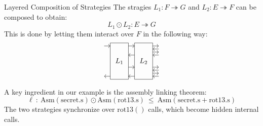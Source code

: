 \documentclass[aspectratio=1610,mathserif]{beamer}
\newcommand{\kw}[1]{\ensuremath{ \mathrm{#1} }}
\begin{document}
\begin{frame}{Layered Composition of Strategies}
  The stragies $L_1 : F \twoheadrightarrow G$ and
  $L_2 : E \twoheadrightarrow F$ can be composed to obtain:
  \[
     L_1 \odot L_2 : E \twoheadrightarrow G
  \]
  \pause
  This is done by letting them interact over $F$
  in the following way:
  \[
    \begin{tikzpicture}[yscale=0.15,xscale=0.30]
      \draw (1,-1) rectangle (4,11) node[midway] {$L_1$};
      \draw (5,-1) rectangle (8,11) node[midway] {$L_2$};
      \draw[->] (0,10) -- (1,10);
        \draw[->] (4,10) -- (5,10);
          \draw[->] (8,10) -- (9,10);
          \draw[->] (9,9) -- (8,9);
          \draw[->] (8,8) -- (9,8);
          \draw[->] (9,7) -- (8,7);
        \draw[->] (5,7) -- (4,7);
        \draw[->] (4,3) -- (5,3);
          \draw[->] (8,3) -- (9,3);
          \draw[->] (9,2) -- (8,2);
          \draw[->] (8,1) -- (9,1);
          \draw[->] (9,0) -- (8,0);
        \draw[->] (5,0) -- (4,0);
      \draw[->] (1,0) -- (0,0);
    \end{tikzpicture}
  \]

  \pause
  \begin{example}[Assembly linking]
    A key ingredient in our example is
    the assembly linking theorem:
    \[ \ell \::\:
       \kw{Asm}(\kw{secret.s}) \odot \kw{Asm}(\kw{rot13.s}) \:\le\:
       \kw{Asm}(\kw{secret.s} + \kw{rot13.s}) \]
    The two strategies synchronize over $\kw{rot13()}$ calls,
    which become hidden internal calls.
  \end{example}
\end{frame}
\end{document}
